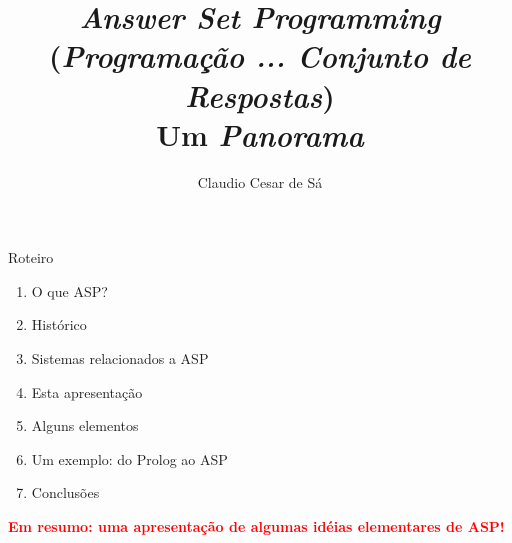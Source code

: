 \documentclass{beamer}
\title[Inteligência Artificial -- Otimização Combinatória] %
{\emph{Answer Set Programming} \\ (\textit{Programação ... Conjunto de Respostas})\\ Um \emph{Panorama}}
\author[Claudio Cesar de Sá] %
{Claudio Cesar de Sá\inst{1}}
\institute[UDESC]{Pesquisador Independente}
\date[\today] %
\begin{document}
\begin{frame}
  \titlepage
\end{frame}








\begin{frame}

\begin{block}{Roteiro}

\begin{enumerate}

  \item  O que ASP?
  \item  Histórico
  \item  Sistemas relacionados a ASP
  \item  Esta apresentação
  \item  Alguns elementos
  \item  Um exemplo: do Prolog ao ASP
  \item  Conclusões

  \end{enumerate}

\end{block}

\pause
\textbf{\textcolor{red}{Em resumo: uma apresentação de algumas idéias elementares de ASP!}}


\end{frame}
\end{document}
